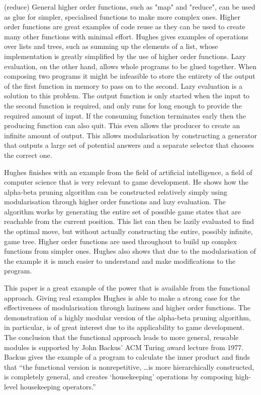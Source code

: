 \functions(reduce)
General higher order functions, such as "map" and "reduce", can be used as glue for
simpler, specialised functions to make more complex ones. Higher order functions
are great examples of code reuse as they can be used to create many other functions
with minimal effort. Hughes gives examples of operations over lists and trees, such
as summing up the elements of a list, whose implementation is greatly simplified
by the use of higher order functions. Lazy evaluation, on the other hand, allows
whole programs to be glued together. When composing two programs it might be
infeasible to store the entirety of the output of the first function in memory to
pass on to the second. Lazy evaluation is a solution to this problem. The output
function is only started when the input to the second function is required, and
only runs for long enough to provide the required amount of input. If the consuming
function terminates early then the producing function can also quit. This even allows the
producer to create an infinite amount of output. This allows modularisation by
constructing a generator that outputs a large set of potential answers and a
separate selector that chooses the correct one.

Hughes finishes with an example from the field of artificial intelligence, a
field of computer science that is very relevant to game development. He shows
how the alpha-beta pruning algorithm can be constructed relatively simply using
modularisation through higher order functions and lazy evaluation. The algorithm
works by generating the entire set of possible game states that are reachable
from the current position. This list can then be lazily evaluated to find the
optimal move, but without actually constructing the entire, possibly infinite,
game tree. Higher order functions are used throughout to build up complex
functions from simpler ones. Hughes also shows that due to the modularisation
of the example it is much easier to understand and make modifications to the
program.

This paper is a great example of the power that is available from the functional
approach. Giving real examples Hughes is able to make a strong case for the
effectiveness of modularisation through laziness and higher order functions.
The demonstration of a highly modular version of the alpha-beta pruning algorithm,
in particular, is of great interest due to its applicability to game development.
The conclusion that the functional approach leads to more general, reusable
modules is supported by John Backus' ACM Turing award lecture from 1977. Backus
gives the example of a program to calculate the inner product and finds that
``the functional version is nonrepetitive, \ldots is more hierarchically constructed,
is completely general, and creates `housekeeping' operations by composing high-level
housekeeping operators.''\cite[-2em]{backus1978liberate}

